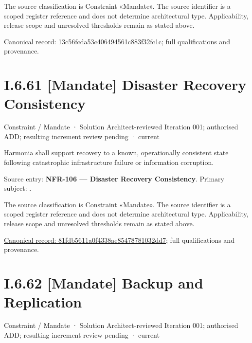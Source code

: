 The source classification is Constraint «Mandate». The source identifier is a scoped register reference and does not determine architectural type. Applicability, release scope and unresolved thresholds remain as stated above.


{\footnotesize \href{../../../../continuum/motivation/constraint/mandate/13c56fcda53c406494561c883f32fc1c.md}{Canonical record: 13c56fcda53c406494561c883f32fc1c}; full qualifications and provenance.}\par
\section*{I.6.61 [Mandate] Disaster Recovery Consistency}
\label{navigation:I.6.61}

\label{element:81fdb5611a0f4338ae85478781032dd7}
{\small Constraint / Mandate · Solution Architect-reviewed Iteration 001; authorised ADD; resulting increment review pending · current}\par

Harmonia shall support recovery to a known, operationally consistent state following catastrophic infrastructure failure or information corruption.



Source entry: \textbf{NFR-106 — Disaster Recovery Consistency}. Primary subject: \texttt{}.



The source classification is Constraint «Mandate». The source identifier is a scoped register reference and does not determine architectural type. Applicability, release scope and unresolved thresholds remain as stated above.


{\footnotesize \href{../../../../continuum/motivation/constraint/mandate/81fdb5611a0f4338ae85478781032dd7.md}{Canonical record: 81fdb5611a0f4338ae85478781032dd7}; full qualifications and provenance.}\par
\section*{I.6.62 [Mandate] Backup and Replication}
\label{navigation:I.6.62}

\label{element:8731f88e202a4f5dacb408e5a1d474a8}
{\small Constraint / Mandate · Solution Architect-reviewed Iteration 001; authorised ADD; resulting increment review pending · current}\par

